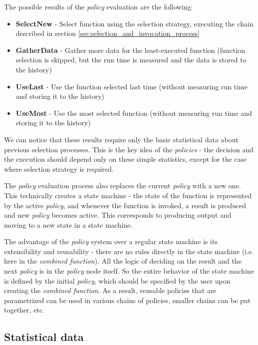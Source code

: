 The possible results of the \textit{policy} evaluation are the following:

\begin{itemize}
	\item \textbf{SelectNew} - Select function using the selection strategy, executing the chain described in section \ref{sec:selection_and_invocation_process}
	\item \textbf{GatherData} - Gather more data for the least-executed function (function selection is skipped, but the run time is measured and the data is stored to the history)
	\item \textbf{UseLast} - Use the function selected last time (without measuring run time and storing it to the history)
	\item \textbf{UseMost} - Use the most selected function (without measuring run time and storing it to the history)
\end{itemize}

We can notice that these results require only the basic statistical data about previous selection processes. This is the key idea of the \textit{policies} - the decision and the execution should depend only on these simple statistics, except for the case where selection strategy is required.

The \textit{policy} evaluation process also replaces the current \textit{policy} with a new one. This technically creates a state machine - the state of the function is represented by the active \textit{policy}, and whenever the function is invoked, a result is produced and new \textit{policy} becomes active. This corresponds to producing output and moving to a new state in a state machine.

The advantage of the \textit{policy} system over a regular state machine is its extensibility and reusability - there are no rules directly in the state machine (i.e. here in the \textit{combined function}). All the logic of deciding on the result and the next \textit{policy} is in the \textit{policy} node itself. So the entire behavior of the state machine is defined by the initial \textit{policy}, which should be specified by the user upon creating the \textit{combined function}. As a result, reusable policies that are parametrized can be used in various chains of policies, smaller chains can be put together, etc.

\subsection{Statistical data}
\label{subsec:statistical_data}

